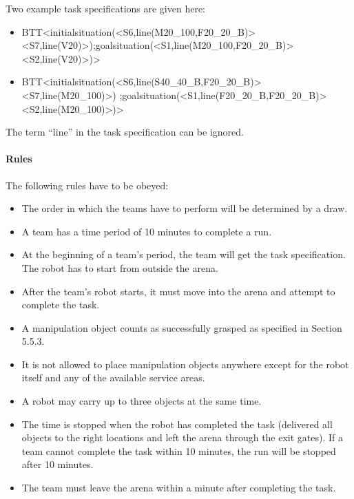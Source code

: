 Two example task specifications are given here:
\begin{itemize}
\item BTT\textless initialsituation(\textless S6,line(M20\_100,F20\_20\_B)\textgreater \textless S7,line(V20)\textgreater);goalsituation(\textless S1,line(M20\_100,F20\_20\_B)\textgreater \textless S2,line(V20)\textgreater )\textgreater
\item  BTT\textless initialsituation(\textless S6,line(S40\_40\_B,F20\_20\_B)\textgreater \textless S7,line(M20\_100)\textgreater) ;goalsituation(\textless S1,line(F20\_20\_B,F20\_20\_B)>\textless S2,line(M20\_100)\textgreater )\textgreater

\end{itemize}

The term “line” in the task specification can be ignored.

%

\paragraph{Rules}
The following rules have to be obeyed:

\begin{itemize}
\item The order in which the teams have to perform will be determined by a draw.
\item A team has a time period of 10 minutes to complete a run.
\item At the beginning of a team’s period, the team will get the task specification. The robot has to start from outside the arena.
\item After the team’s robot starts, it must move into the arena and attempt to complete the task. 
\item A manipulation object counts as successfully grasped as specified in Section 5.5.3. 
\item It is not allowed to place manipulation objects anywhere except for the robot itself and any of the available service areas.
\item A robot may carry up to three objects at the same time.
\item The time is stopped when the robot has completed the task (delivered all objects to the right locations and left the arena through the exit gates). If a team cannot complete the task within 10 minutes, the run will be stopped after 10 minutes. 
\item The team must leave the arena within a minute after completing the task.
\end{itemize}


